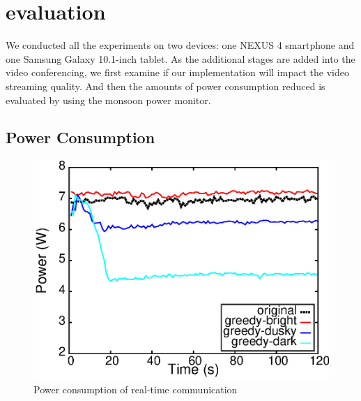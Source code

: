 \section{evaluation}
\label{sec:evaluation}
We conducted all the experiments on two devices: one NEXUS 4
smartphone and one Samsung Galaxy 10.1-inch tablet. As the
additional stages are added into the video conferencing, we first
examine if our implementation will impact the video streaming
quality. And then the amounts of power consumption reduced is
evaluated by using the monsoon power monitor. 

\subsection{Power Consumption}

\begin{figure}[t]
  \begin{center}
  \includegraphics[scale=.5]{./figures/power.eps}
  \caption{Power consumption of real-time communication}
  \label{fig:power}
  \end{center}
\end{figure}



